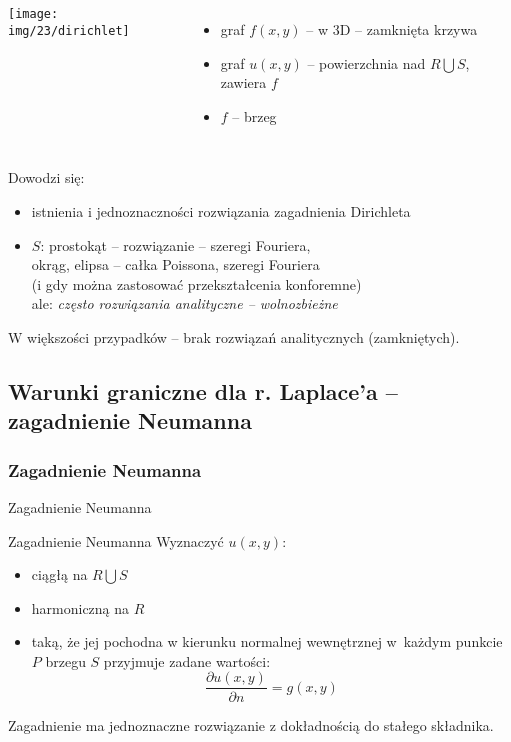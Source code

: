 \begin{frame}
  \begin{columns}
      \texttt{[image: img/23/dirichlet]}
      \begin{itemize}
        \item graf $f(x,y)$ -- w 3D -- zamknięta krzywa
        \item graf $u(x,y)$ -- powierzchnia nad $R \bigcup S$, zawiera $f$
        \item $f$ -- brzeg
      \end{itemize}
  \end{columns}
\end{frame}

\begin{frame}
  Dowodzi się:
  \begin{itemize}
    \item istnienia i jednoznaczności rozwiązania zagadnienia Dirichleta
    \item $S$: prostokąt -- rozwiązanie -- szeregi Fouriera, \\
    okrąg, elipsa -- całka Poissona, szeregi Fouriera \\
    (i gdy można zastosować przekształcenia konforemne) \\
    ale: \textit{często rozwiązania analityczne -- wolnozbieżne}
  \end{itemize}

  W większości przypadków -- brak rozwiązań analitycznych (zamkniętych).
\end{frame}

\subsection*{Warunki graniczne dla r. Laplace'a -- zagadnienie Neumanna}
\subsubsection{Zagadnienie Neumanna}

\begin{frame}{Zagadnienie Neumanna}
  \begin{block}{Zagadnienie Neumanna}
    Wyznaczyć $u(x,y)$:
    \begin{itemize}
      \item ciągłą na $R \bigcup S$
      \item harmoniczną na $R$
      \item taką, że jej pochodna w kierunku normalnej wewnętrznej w~każdym punkcie $P$ brzegu $S$ przyjmuje zadane wartości:
      $$\frac{{\partial}u(x,y)}{{\partial}n} = g(x,y)$$
    \end{itemize}
  \end{block}
  Zagadnienie ma jednoznaczne rozwiązanie z dokładnością do stałego składnika.
\end{frame}

